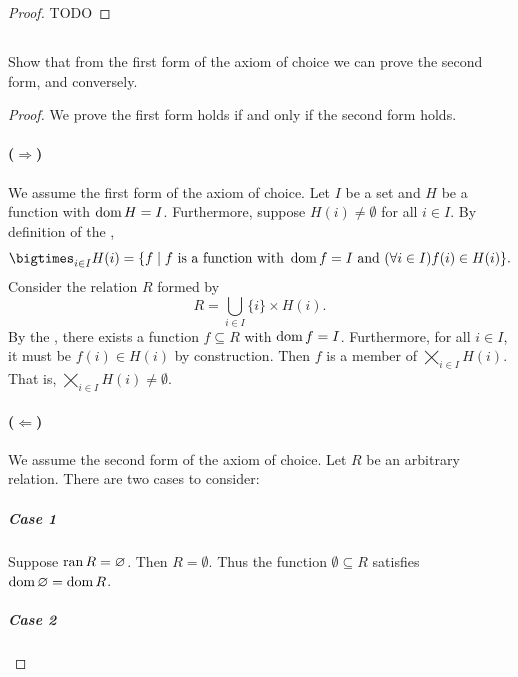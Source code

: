 \documentclass{report}
\begin{document}
\begin{proof}

  TODO

\end{proof}

\subsection{}%

Show that from the first form of the axiom of choice we can prove the second
  form, and conversely.

\begin{proof}

  We prove the first form holds if and only if the second form holds.

  \paragraph{($\Rightarrow$)}%

    We assume the first form of the axiom of choice.
    Let $I$ be a set and $H$ be a function with $\mathop{\text{dom}}{H} = I$.
    Furthermore, suppose $H(i) \neq \emptyset$ for all $i \in I$.
    By definition of the ,
      $$\bigtimes_{i \in I} H(i) = \{f \mid
        f \text{ is a function with } \dom{f} = I \text{ and }
          (\forall i \in I) f(i) \in H(i)\}.$$
    Consider the relation $R$ formed by
      $$R = \bigcup_{i \in I} \{i\} \times H(i).$$
    By the , there exists a function
      $f \subseteq R$ with $\mathop{\text{dom}}{f} = I$.
    Furthermore, for all $i \in I$, it must be $f(i) \in H(i)$ by construction.
    Then $f$ is a member of $\bigtimes_{i \in I} H(i)$.
    That is, $\bigtimes_{i \in I} H(i) \neq \emptyset$.

  \paragraph{($\Leftarrow$)}%

    We assume the second form of the axiom of choice.
    Let $R$ be an arbitrary relation.
    There are two cases to consider:

    \subparagraph{Case 1}%

      Suppose $\mathop{\text{ran}}{R} = \varnothing$.
      Then $R = \emptyset$.
      Thus the function $\emptyset \subseteq R$ satisfies
        $\mathop{\text{dom}}{\varnothing} = \mathop{\text{dom}}{R}$.

    \subparagraph{Case 2}%


\end{proof}
\end{document}
